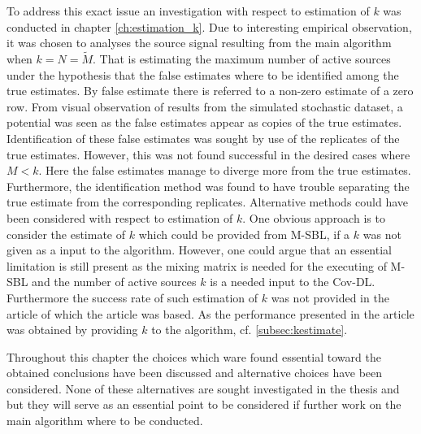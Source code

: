 To address this exact issue an investigation with respect to estimation of $k$ was conducted in chapter \ref{ch:estimation_k}. 
Due to interesting empirical observation, it was chosen to analyses the source signal resulting from the main algorithm when $k = N = \widetilde{M}$. 
That is estimating the maximum number of active sources under the hypothesis that the false estimates where to be identified among the true estimates. By false estimate there is referred to a non-zero estimate of a zero row. 
From visual observation of results from the simulated stochastic dataset, a potential was seen as the false estimates appear as copies of the true estimates. 
Identification of these false estimates was sought by use of the replicates of the true estimates.
However, this was not found successful in the desired cases where $M<k$. 
Here the false estimates manage to diverge more from the true estimates. 
Furthermore, the identification method was found to have trouble separating the true estimate from the corresponding replicates.
Alternative methods could have been considered with respect to estimation of $k$. 
One obvious approach is to consider the estimate of $k$ which could be provided from M-SBL, if a $k$ was not given as a input to the algorithm. 
However, one could argue that an essential limitation is still present as the mixing matrix is needed for the executing of M-SBL and the number of active sources $k$ is a needed input to the Cov-DL. Furthermore the success rate of such estimation of $k$ was not provided in the article \cite{Balkan2014} of which the article was based. As the performance presented in the article was obtained by providing $k$ to the algorithm, cf. \ref{subsec:kestimate}.   

Throughout this chapter the choices which ware found essential toward the obtained conclusions have been discussed and alternative choices have been considered. 
None of these alternatives are sought investigated in the thesis and but they will serve as an essential point to be considered if further work on the main algorithm where to be conducted.


      
        


       
 